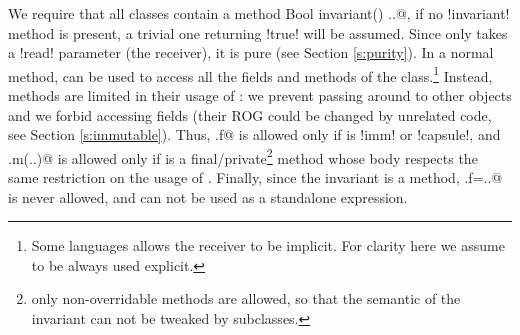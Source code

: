 



We require that all classes contain a \Q@read method Bool invariant() {..}@, if no \Q!invariant! method is present, a trivial one returning \Q!true! will be assumed. Since \Q@invariant@ only takes a \Q!read! parameter (the receiver), it is pure
(see Section \ref{s:purity}).
In a normal method, \Q@this@ can be used to access all the fields and methods of the class.\footnote{Some languages allows the \Q@this@ receiver to be implicit. For clarity here we assume \Q@this@ to be always used explicit.} Instead, \Q@invariant@ methods are limited in their usage of \Q@this@:
we prevent passing \Q@this@ around to other objects and we forbid accessing \Q@mut@ fields (their ROG could be changed by unrelated code, see Section \ref{s:immutable}).
Thus, \Q@this.f@ is allowed only if \Q@f@ is \Q!imm! or \Q!capsule!, and 
\Q@this.m(..)@ is allowed only if \Q@m@ is a final/private\footnote{only non-overridable methods are allowed, so that the semantic of the invariant can not be tweaked by subclasses.}
method whose body respects the same restriction on the usage of \Q@this@.
Finally, since the invariant is a \Q@read@ method,
\Q@this.f=..@ is never allowed, and \Q@this@ can not be used as a standalone expression.


